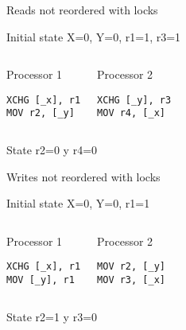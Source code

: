 \begin{frame}[t,fragile]{Reads not reordered with locks}

\begin{block}{Initial state}
X=0, Y=0, r1=1, r3=1
\end{block}


\begin{columns}[T]


\begin{block}{Processor 1}
\begin{lstlisting}[language={[x86masm]Assembler}]
XCHG [_x], r1
MOV r2, [_y]
\end{lstlisting}
\end{block}

\begin{block}{Processor 2}
\begin{lstlisting}[language={[x86masm]Assembler}]
XCHG [_y], r3
MOV r4, [_x]
\end{lstlisting}
\end{block}

\end{columns}


\begin{block}{State }
r2=0 y r4=0
\end{block}

\end{frame}


\begin{frame}[t,fragile]{Writes not reordered with locks}

\begin{block}{Initial state}
X=0, Y=0, r1=1
\end{block}


\begin{columns}[T]


\begin{block}{Processor 1}
\begin{lstlisting}[language={[x86masm]Assembler}]
XCHG [_x], r1
MOV [_y], r1
\end{lstlisting}
\end{block}

\begin{block}{Processor 2}
\begin{lstlisting}[language={[x86masm]Assembler}]
MOV r2, [_y]
MOV r3, [_x]
\end{lstlisting}
\end{block}

\end{columns}


\begin{block}{State }
r2=1 y r3=0
\end{block}

\end{frame}

